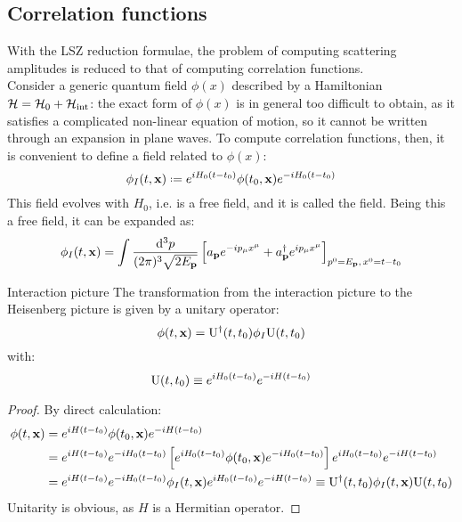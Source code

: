 \subsection{Correlation functions}

With the LSZ reduction formulae, the problem of computing scattering amplitudes is reduced to that of computing correlation functions. \\
Consider a generic quantum field $ \phi(x) $ described by a Hamiltonian $ \mathcal{H} = \mathcal{H}_0 + \mathcal{H}_\text{int} $: the exact form of $ \phi(x) $ is in general too difficult to obtain, as it satisfies a complicated non-linear equation of motion, so it cannot be written through an expansion in plane waves. To compute correlation functions, then, it is convenient to define a field related to $ \phi(x) $:
\begin{equation}
  \phi_I(t,\ve{x}) \defeq e^{i H_0 (t-t_0)} \phi(t_0, \ve{x}) e^{-i H_0 (t-t_0)}
\end{equation}
This field evolves with $ H_0 $, i.e. is a free field, and it is called the  field. Being this a free field, it can be expanded as:
\begin{equation}
  \phi_I(t,\mathbf{x}) = \int \frac{\mathrm{d}^3p}{(2\pi)^3 \sqrt{2E_{\mathbf{p}}}} \left[ a_{\mathbf{p}} e^{-i p_\mu x^\mu} + a_{\mathbf{p}}^\dagger e^{i p_\mu x^\mu} \right]_{p^0 = E_{\mathbf{p}} ,\, x^0 = t - t_0}
\end{equation}

\begin{proposition}{Interaction picture}{}
  The transformation from the interaction picture to the Heisenberg picture is given by a unitary operator:
  \begin{equation}
    \phi(t,\mathbf{x}) = \mathrm{U}^\dagger(t,t_0) \phi_I \mathrm{U}(t,t_0)
    \label{eq:int-heis-pic}
  \end{equation}
  with:
  \begin{equation}
    \mathrm{U}(t,t_0) \equiv e^{i H_0 (t-t_0)} e^{-i H (t-t_0)}
  \end{equation}
\end{proposition}

\begin{proofbox}
  \begin{proof}
    By direct calculation:
    \begin{equation*}
      \begin{split}
        \phi(t,\mathbf{x})
        & = e^{i H (t-t_0)} \phi(t_0,\mathbf{x}) e^{-i H (t-t_0)} \\
        & = e^{i H (t-t_0)} e^{-i H_0 (t-t_0)} \left[ e^{i H_0 (t-t_0)} \phi(t_0,\mathbf{x}) e^{-i H_0 (t-t_0)} \right] e^{i H_0 (t-t_0)} e^{-i H (t-t_0)} \\
        & = e^{i H (t-t_0)} e^{-i H_0 (t-t_0)} \phi_I(t,\mathbf{x}) e^{i H_0 (t-t_0)} e^{-i H (t-t_0)} \equiv \mathrm{U}^\dagger(t,t_0) \phi_I(t,\mathbf{x}) \mathrm{U}(t,t_0)
      \end{split}
    \end{equation*}
    Unitarity is obvious, as $ H $ is a Hermitian operator.
  \end{proof}
\end{proofbox}

